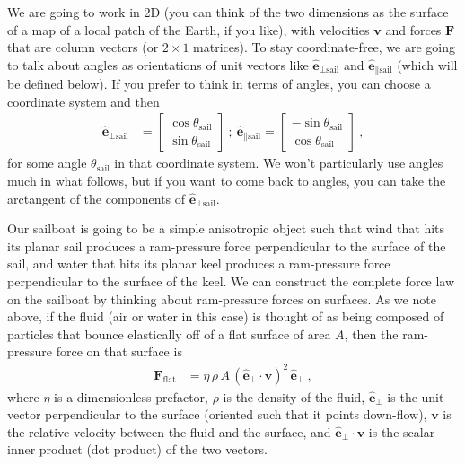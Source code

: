 \documentclass[letterpaper]{article}
\renewcommand{\vec}[1]{\boldsymbol{#1}}
\newcommand{\uvec}{\vec{\hat{e}}}
\renewcommand{\flat}{\text{flat}}
\newcommand{\sail}{\text{sail}}
\begin{document}
We are going to work in 2D (you can think of the two dimensions as the surface of a map of a local patch of the Earth, if you like), with velocities $\vec{v}$ and forces $\vec{F}$ that are column vectors (or $2\times 1$ matrices).
To stay coordinate-free, we are going to talk about angles as orientations of unit vectors like $\uvec_{\perp\sail}$ and $\uvec_{\parallel\sail}$ (which will be defined below).
If you prefer to think in terms of angles, you can choose a coordinate system and then
\begin{align}
    \uvec_{\perp\sail} &= \begin{bmatrix}\cos\theta_\sail \\ \sin\theta_\sail\end{bmatrix} ~ ; ~ \uvec_{\parallel\sail} = \begin{bmatrix}-\sin\theta_\sail \\ \cos\theta_\sail\end{bmatrix} ~,
\end{align}
for some angle $\theta_\sail$ in that coordinate system.
We won't particularly use angles much in what follows, but if you want to come back to angles, you can take the arctangent of the components of $\uvec_{\perp\sail}$.

Our sailboat is going to be a simple anisotropic object such that wind that hits its planar sail produces a ram-pressure force perpendicular to the surface of the sail,
and water that hits its planar keel produces a ram-pressure force perpendicular to the surface of the keel.
We can construct the complete force law on the sailboat by thinking about ram-pressure forces on surfaces.
As we note above, if the fluid (air or water in this case) is thought of as being composed of particles that bounce elastically off of a flat surface of area $A$, then the ram-pressure force on that surface is
\begin{align}\label{eq:flat}
    \vec{F}_\flat &= \eta\,\rho\,A\,(\uvec_\perp\cdot\vec{v})^2\,\uvec_\perp ~,
\end{align}
where $\eta$ is a dimensionless prefactor, $\rho$ is the density of the fluid, $\uvec_\perp$ is the unit vector perpendicular to the surface (oriented such that it points down-flow), $\vec{v}$ is the %
relative velocity between the fluid and the surface,
and $\uvec_\perp\cdot\vec{v}$ is the scalar inner product (dot product) of the two vectors.
\end{document}
